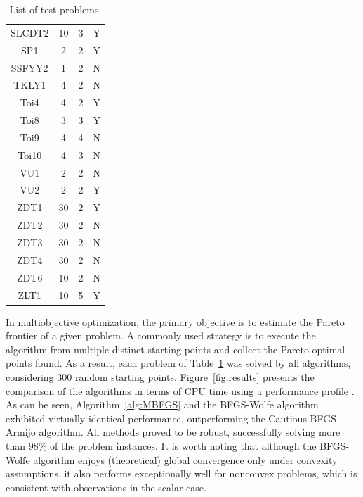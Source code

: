 \documentclass[11pt]{article}
\newcommand{\lightgray}{0.95}
\numberwithin{assumption}{section}
\begin{document}
\begin{table}[H]
\begin{minipage}{0.40\textwidth}
\begin{threeparttable}
{\begin{tabular}{|cccc|}
SLCDT2&  10 &  3 & Y   \\    \rowcolor[gray]{\lightgray}
SP1&      2 &  2 & Y    \\  
SSFYY2&      1 &  2 & N    \\    \rowcolor[gray]{\lightgray}
TKLY1&4 & 2  & N    \\
Toi4&   4 &  2 & Y    \\     \rowcolor[gray]{\lightgray}
Toi8&   3 &  3 & Y    \\
Toi9 & 4   & 4 & N    \\     \rowcolor[gray]{\lightgray}
Toi10 & 4 & 3 & N        \\  
VU1&    2 &  2 & N   \\     \rowcolor[gray]{\lightgray}
VU2& 2  &  2 & Y   \\
ZDT1&30 & 2  & Y    \\   \rowcolor[gray]{\lightgray}
ZDT2&  30 & 2  & N    \\ 
ZDT3& 30  & 2  & N    \\   \rowcolor[gray]{\lightgray}
ZDT4&  30 &  2 & N    \\ 
ZDT6& 10 & 2  & N    \\   \rowcolor[gray]{\lightgray}
ZLT1&  10 &  5 & Y   \\  
\hline
\end{tabular}}
\end{threeparttable}
\end{minipage}
\caption{List of test problems.}
\label{tab:problems}
\end{table}


In multiobjective optimization, the primary objective is to estimate the Pareto frontier of a given problem. A commonly used strategy is to execute the algorithm from multiple distinct starting points and collect the Pareto optimal points found. As a result, each problem of Table~\ref{tab:problems}  was solved by all algorithms, considering 300 random starting points.
Figure~\ref{fig:results} presents the comparison of the algorithms in terms of CPU time using a performance profile \cite{dolan2002benchmarking}.
As can be seen, Algorithm~\ref{alg:MBFGS} and the BFGS-Wolfe algorithm exhibited virtually identical performance, outperforming the Cautious BFGS-Armijo algorithm. All methods proved to be robust, successfully solving more than $98\%$ of the problem instances.
It is worth noting that although the BFGS-Wolfe algorithm enjoys (theoretical) global convergence only under convexity assumptions, it also performs exceptionally well for nonconvex problems, which is consistent with observations in the scalar case.
\end{document}
